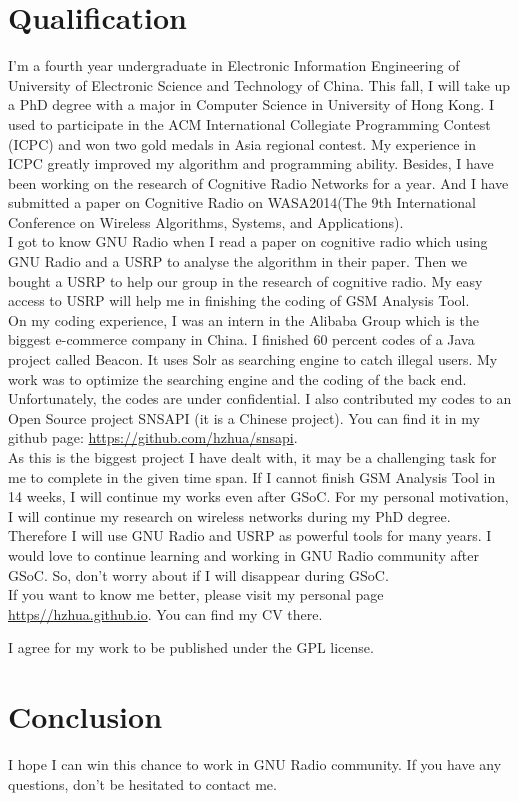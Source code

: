 \documentclass[a4paper,12pt,oneside]{article}
\begin{document}
\section{Qualification}
I'm a fourth year undergraduate in Electronic Information Engineering of University of Electronic Science and Technology of China. This fall, I will take up a PhD degree with a major in Computer Science in University of Hong Kong. I used to participate in the ACM International Collegiate Programming Contest (ICPC) and won two gold medals in Asia regional contest. My experience in ICPC greatly improved my algorithm and programming ability. Besides, I have been working on the research of Cognitive Radio Networks for a year. And I have submitted a paper on Cognitive Radio on WASA2014(The 9th International Conference on Wireless Algorithms, Systems, and Applications). \\

I got to know GNU Radio when I read a paper on cognitive radio which using GNU Radio and a USRP to analyse the algorithm in their paper. Then we bought a USRP to help our group in the research of cognitive radio. My easy access to USRP will help me in finishing the coding of GSM Analysis Tool.\\

On my coding experience, I was an intern in the Alibaba Group which is the biggest e-commerce company in China. I finished 60 percent codes of a Java project called Beacon. It uses Solr as searching engine to catch illegal users. My work was to optimize the searching engine and the coding of the back end. Unfortunately, the codes are under confidential. I also contributed my codes to an Open Source project SNSAPI (it is a Chinese project). You can find it in my github page: \url{https://github.com/hzhua/snsapi}.\\

As this is the biggest project I have dealt with, it may be a challenging task for me to complete in the given time span. If I cannot finish GSM Analysis Tool in 14 weeks, I will continue my works even after GSoC. For my personal motivation, I will continue my research on wireless networks during my PhD degree. Therefore I will use GNU Radio and USRP as powerful tools for many years. I would love to continue learning and working in GNU Radio community after GSoC. So, don't worry about if I will disappear during GSoC.\\

If you want to know me better, please visit my personal page \url{https//hzhua.github.io}. You can find my CV there.

I agree for my work to be published under the GPL license.

\section{Conclusion}
I hope I can win this chance to work in GNU Radio community. If you have any questions, don't be hesitated to contact me.

\end{document}
